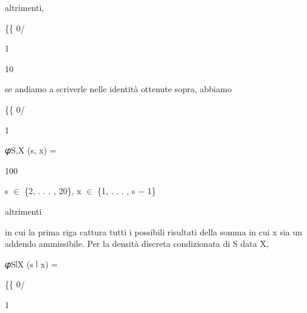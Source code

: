 \documentclass[a4paper,portrait,12pt]{article}
\begin{document}
\begin{flushleft}
altrimenti,
\end{flushleft}





\{\{ 0/


1





10





\begin{flushleft}
se andiamo a scriverle nelle identit\`{a} ottenute sopra, abbiamo
\end{flushleft}





\{\{ 0/


1





\begin{flushleft}
𝜑S,X (s, x) =
\end{flushleft}





100





\begin{flushleft}
s $\in$ \{2, . . . , 20\}, x $\in$ \{1, . . . , s $-$ 1\}
\end{flushleft}


\begin{flushleft}
altrimenti
\end{flushleft}





\begin{flushleft}
in cui la prima riga cattura tutti i possibili risultati della somma in cui x sia un addendo ammissibile. Per la densit\`{a} discreta condizionata di S data X,
\end{flushleft}


\begin{flushleft}
𝜑S∣X (s ∣ x) =
\end{flushleft}





\{\{ 0/


1
\end{document}
